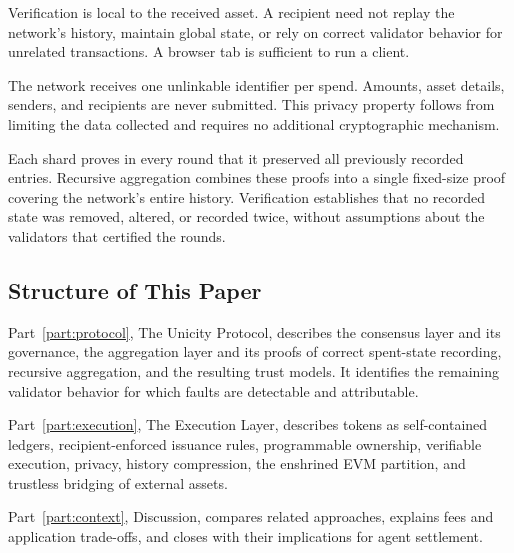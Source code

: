 Verification is local to the received asset. A recipient need not replay the network's history, maintain global state, or rely on correct validator behavior for unrelated transactions. A browser tab is sufficient to run a client.

The network receives one unlinkable identifier per spend. Amounts, asset details, senders, and recipients are never submitted. This privacy property follows from limiting the data collected and requires no additional cryptographic mechanism.

Each shard proves in every round that it preserved all previously recorded entries. Recursive aggregation combines these proofs into a single fixed-size proof covering the network's entire history. Verification establishes that no recorded state was removed, altered, or recorded twice, without assumptions about the validators that certified the rounds.

\subsection*{Structure of This Paper}

Part~\ref{part:protocol}, The Unicity Protocol, describes the consensus layer and its governance, the aggregation layer and its proofs of correct spent-state recording, recursive aggregation, and the resulting trust models. It identifies the remaining validator behavior for which faults are detectable and attributable.

Part~\ref{part:execution}, The Execution Layer, describes tokens as self-contained ledgers, recipient-enforced issuance rules, programmable ownership, verifiable execution, privacy, history compression, the enshrined EVM partition, and trustless bridging of external assets.

Part~\ref{part:context}, Discussion, compares related approaches, explains fees and application trade-offs, and closes with their implications for agent settlement.




